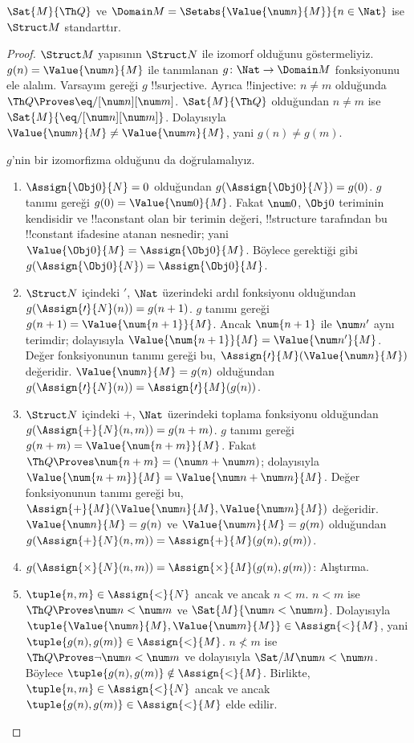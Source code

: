 \begin{prop}
$\Sat{M}{\Th Q}$ ve
$\Domain M=\Setabs{\Value{\num n}{M}}{n\in\Nat}$ ise $\Struct M$
standarttır.
\end{prop}

\begin{proof}
$\Struct M$ yapısının $\Struct N$ ile izomorf olduğunu göstermeliyiz.
$g(n)=\Value{\num n}{M}$ ile tanımlanan
$g\colon\Nat\to\Domain M$ fonksiyonunu ele alalım. Varsayım gereği
$g$ !!{surjective}. Ayrıca !!{injective}: $n\neq m$ olduğunda
$\Th Q\Proves\eq/[\num n][\num m]$. $\Sat{M}{\Th Q}$ olduğundan
$n\neq m$ ise $\Sat{M}{\eq/[\num n][\num m]}$. Dolayısıyla
$\Value{\num n}{M}\neq\Value{\num m}{M}$, yani $g(n)\neq g(m)$.

$g$'nin bir izomorfizma olduğunu da doğrulamalıyız.
\begin{enumerate}
\item $\Assign{\Obj0}{N}=0$ olduğundan
  $g(\Assign{\Obj0}{N})=g(0)$. $g$ tanımı gereği
  $g(0)=\Value{\num0}{M}$. Fakat $\num0$, $\Obj0$ teriminin
  kendisidir ve !!a{constant} olan bir terimin değeri, !!{structure}
  tarafından bu !!{constant} ifadesine atanan nesnedir; yani
  $\Value{\Obj0}{M}=\Assign{\Obj0}{M}$. Böylece gerektiği gibi
  $g(\Assign{\Obj0}{N})=\Assign{\Obj0}{M}$.
\item $\Struct N$ içindeki $\prime$, $\Nat$ üzerindeki ardıl fonksiyonu
  olduğundan $g(\Assign{\prime}{N}(n))=g(n+1)$. $g$ tanımı gereği
  $g(n+1)=\Value{\num{n+1}}{M}$. Ancak $\num{n+1}$ ile $\num n'$
  aynı terimdir; dolayısıyla
  $\Value{\num{n+1}}{M}=\Value{\num n'}{M}$. Değer fonksiyonunun
  tanımı gereği bu,
  $\Assign{\prime}{M}(\Value{\num n}{M})$ değeridir.
  $\Value{\num n}{M}=g(n)$ olduğundan
  $g(\Assign{\prime}{N}(n))=\Assign{\prime}{M}(g(n))$.
\item $\Struct N$ içindeki $+$, $\Nat$ üzerindeki toplama fonksiyonu
  olduğundan $g(\Assign{+}{N}(n,m))=g(n+m)$. $g$ tanımı gereği
  $g(n+m)=\Value{\num{n+m}}{M}$. Fakat
  $\Th Q\Proves\num{n+m}=(\num n+\num m)$; dolayısıyla
  $\Value{\num{n+m}}{M}=\Value{\num n+\num m}{M}$. Değer
  fonksiyonunun tanımı gereği bu,
  $\Assign{+}{M}(\Value{\num n}{M},\Value{\num m}{M})$ değeridir.
  $\Value{\num n}{M}=g(n)$ ve $\Value{\num m}{M}=g(m)$ olduğundan
  $g(\Assign{+}{N}(n,m))=\Assign{+}{M}(g(n),g(m))$.
\item $g(\Assign{\times}{N}(n,m))=
  \Assign{\times}{M}(g(n),g(m))$: Alıştırma.
\item $\tuple{n,m}\in\Assign{<}{N}$ ancak ve ancak $n<m$. $n<m$ ise
  $\Th Q\Proves\num n<\num m$ ve $\Sat{M}{\num n<\num m}$.
  Dolayısıyla
  $\tuple{\Value{\num n}{M},\Value{\num m}{M}}\in\Assign{<}{M}$,
  yani $\tuple{g(n),g(m)}\in\Assign{<}{M}$. $n\not<m$ ise
  $\Th Q\Proves\lnot\num n<\num m$ ve dolayısıyla
  $\Sat/{M}{\num n<\num m}$. Böylece
  $\tuple{g(n),g(m)}\notin\Assign{<}{M}$. Birlikte,
  $\tuple{n,m}\in\Assign{<}{N}$ ancak ve ancak
  $\tuple{g(n),g(m)}\in\Assign{<}{M}$ elde edilir.
\end{enumerate}
\end{proof}

